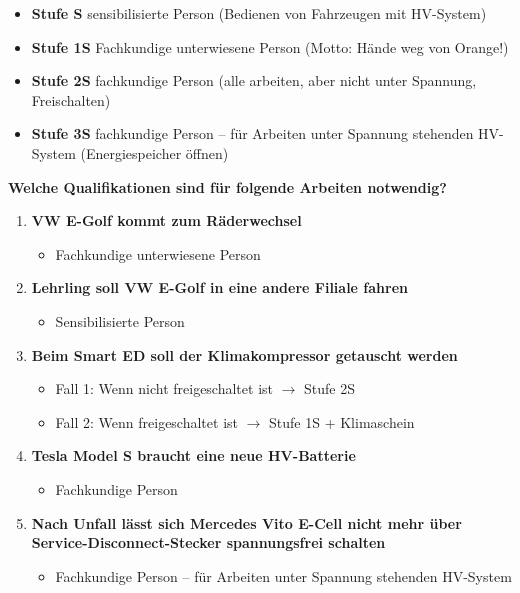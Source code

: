 \begin{itemize}
\item
  \textbf{Stufe S} sensibilisierte Person (Bedienen von Fahrzeugen mit
  HV-System)
\item
  \textbf{Stufe 1S} Fachkundige unterwiesene Person (Motto: Hände weg
  von Orange!)
\item
  \textbf{Stufe 2S} fachkundige Person (alle arbeiten, aber nicht unter
  Spannung, Freischalten)
\item
  \textbf{Stufe 3S} fachkundige Person -- für Arbeiten unter Spannung
  stehenden HV-System (Energiespeicher öffnen)
\end{itemize}

\textbf{Welche Qualifikationen sind für folgende Arbeiten notwendig?}

\begin{enumerate}
\item
  \textbf{VW E-Golf kommt zum Räderwechsel}

  \begin{itemize}
  \item
    Fachkundige unterwiesene Person
  \end{itemize}
\item
  \textbf{Lehrling soll VW E-Golf in eine andere Filiale fahren}

  \begin{itemize}
  \item
    Sensibilisierte Person
  \end{itemize}
\item
  \textbf{Beim Smart ED soll der Klimakompressor getauscht werden}

  \begin{itemize}
  \item
    Fall 1: Wenn nicht freigeschaltet ist $\to$ Stufe 2S
  \item
    Fall 2: Wenn freigeschaltet ist $\to$ Stufe 1S + Klimaschein
  \end{itemize}
\item
  \textbf{Tesla Model S braucht eine neue HV-Batterie}

  \begin{itemize}
  \item
    Fachkundige Person
  \end{itemize}
\item
  \textbf{Nach Unfall lässt sich Mercedes Vito E-Cell nicht mehr über
  Service-Disconnect-Stecker spannungsfrei schalten}

  \begin{itemize}
  \item
    Fachkundige Person -- für Arbeiten unter Spannung stehenden
    HV-System
  \end{itemize}
\end{enumerate}


